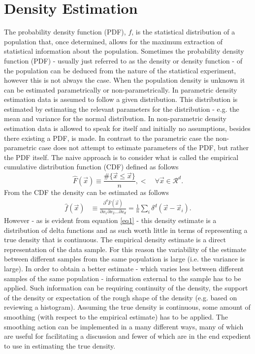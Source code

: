 \documentclass[
twoside,
openright,
titlepage,
numbers=noenddot,
headinclude,%
footinclude=true,
dottedtoc, %
ngerman,
american, %
pagesize=pdftex,
]{book}
\begin{document}
	\chapter{Density Estimation}
	\label{chp:dens}
	The probability density function (PDF), $f$, is the statistical distribution of a population that, once determined, allows for the maximum extraction of statistical information about the population. Sometimes the probability density function (PDF) - usually just referred to as the density or density function - of the population can be deduced from the nature of the statistical experiment, however this is not always the case. When the population density is unknown it can be estimated parametrically or non-parametrically. In parametric density estimation data is assumed to follow a given distribution. This distribution is estimated by estimating the relevant parameters for the distribution - e.g. the mean and variance for the normal distribution. In non-parametric density estimation data is allowed to speak for itself and initially no assumptions, besides there existing a PDF, is made. In contrast to the parametric case the non-parametric case does not attempt to estimate parameters of the PDF, but rather the PDF itself. The naive approach is to consider what is called the empirical cumulative distribution function (CDF) defined as follows~\citep{Scott2015}
	\begin{equation}
		\hat{F}(\vec{x})\equiv \frac{\#\{\vec{x}\leq \vec{x}\}}{n},<\quad\forall \vec{x}\in \mathcal{R}^d.
		\label{eeq1}
	\end{equation}
	From the CDF the density can be estimated as follows
	\begin{equation}
		\begin{split}
			\hat{f}(\vec{x})&\equiv \frac{\partial ^d\hat{F}(\vec{x})}{\partial x_1\partial x_2\dots \partial x_d}=\frac{1}{n}\sum_{i}\delta^d(\vec{x}-\vec{x}_i).
		\end{split}
		\label{eq1}
	\end{equation}
	However - as is evident from equation \eqref{eq1} - this density estimate is a distribution of delta functions and as such worth little in terms of representing a true density that is continuous. The empirical density estimate is a direct representation of the data sample. For this reason the variability of the estimate between different samples from the same population is large (i.e. the variance is large). In order to obtain a better estimate - which varies less between different samples of the same population - information external to the sample has to be applied. Such information can be requiring continuity of the density, the support of the density or expectation of the rough shape of the density (e.g. based on reviewing a histogram). Assuming the true density is continuous, some amount of smoothing (with respect to the empirical estimate) has to be applied. The smoothing action can be implemented in a many different ways, many of which are useful for facilitating a discussion and fewer of which are in the end expedient to use in estimating the true density. 
\end{document}
